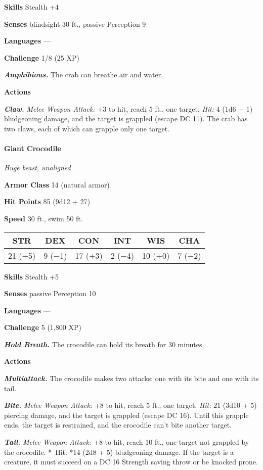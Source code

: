 \documentclass[
]{article}
\begin{document}
\textbf{Skills} Stealth +4

\textbf{Senses} blindsight 30 ft., passive Perception 9

\textbf{Languages} ---

\textbf{Challenge} 1/8 (25 XP)

\emph{\textbf{Amphibious.}} The crab can breathe air and water.

\textbf{Actions}

\emph{\textbf{Claw.}} \emph{Melee Weapon Attack:} +3 to hit, reach 5
ft., one target. \emph{Hit:} 4 (1d6 + 1) bludgeoning damage, and the
target is grappled (escape DC 11). The crab has two claws, each of which
can grapple only one target.

\hypertarget{giant-crocodile}{%
\paragraph{Giant Crocodile}\label{giant-crocodile}}

\emph{Huge beast, unaligned}

\textbf{Armor Class} 14 (natural armor)

\textbf{Hit Points} 85 (9d12 + 27)

\textbf{Speed} 30 ft., swim 50 ft.

\begin{longtable}[]{@{}cccccc@{}}
\toprule
STR & DEX & CON & INT & WIS & CHA\tabularnewline
\midrule
\endhead
21 (+5) & 9 (−1) & 17 (+3) & 2 (−4) & 10 (+0) & 7 (−2)\tabularnewline
\bottomrule
\end{longtable}

\textbf{Skills} Stealth +5

\textbf{Senses} passive Perception 10

\textbf{Languages} ---

\textbf{Challenge} 5 (1,800 XP)

\emph{\textbf{Hold Breath.}} The crocodile can hold its breath for 30
minutes.

\textbf{Actions}

\emph{\textbf{Multiattack.}} The crocodile makes two attacks: one with
its bite and one with its tail.

\emph{\textbf{Bite.}} \emph{Melee Weapon Attack:} +8 to hit, reach 5
ft., one target. \emph{Hit:} 21 (3d10 + 5) piercing damage, and the
target is grappled (escape DC 16). Until this grapple ends, the target
is restrained, and the crocodile can't bite another target.

\emph{\textbf{Tail.}} \emph{Melee Weapon Attack:} +8 to hit, reach 10
ft., one target not grappled by the crocodile. *~Hit: *14 (2d8 + 5)
bludgeoning damage. If the target is a creature, it must succeed on a DC
16 Strength saving throw or be knocked prone.
\end{document}
